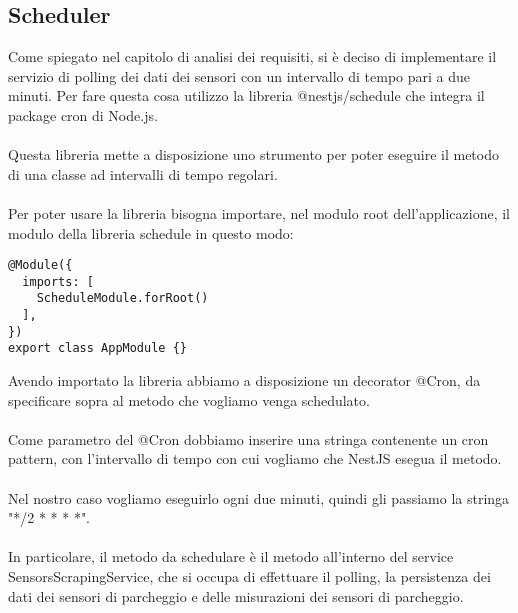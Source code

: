 \subsection{Scheduler}
Come spiegato nel capitolo di analisi dei requisiti, si è deciso di implementare il servizio di polling dei dati
dei sensori con un intervallo di tempo pari a due minuti. Per fare questa cosa utilizzo 
la libreria @nestjs/schedule che integra il package cron di Node.js.
\\\\
Questa libreria mette a disposizione uno strumento per poter eseguire il metodo
di una classe ad intervalli di tempo regolari.
\\\\
Per poter usare la libreria bisogna importare, nel modulo root dell'applicazione, il modulo della libreria schedule in questo modo:
\begin{lstlisting}
@Module({
  imports: [
    ScheduleModule.forRoot()
  ],
})
export class AppModule {}
\end{lstlisting}
\leavevmode\newline
Avendo importato la libreria abbiamo a disposizione un decorator @Cron, da specificare sopra al metodo che vogliamo venga 
schedulato. 
\\\\
Come parametro del @Cron dobbiamo inserire una stringa contenente un cron pattern, con
l'intervallo di tempo con cui vogliamo che NestJS esegua il metodo.
\\\\
Nel nostro caso vogliamo eseguirlo ogni due minuti, quindi gli passiamo la stringa "*/2 * * * *".
\\\\
In particolare, il metodo da schedulare è il metodo all'interno del service SensorsScrapingService, che si occupa
di effettuare il polling, la persistenza dei dati dei sensori di parcheggio e delle misurazioni dei sensori di parcheggio.

